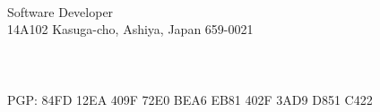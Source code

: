 \documentclass{cv_style_yui}
\begin{document}

\begin{center} 
   \\
  Software Developer \\
  14\-A102 Kasuga-cho, Ashiya, Japan 659-0021 \\
   \\
   \\
   \\
  PGP: 84FD 12EA 409F 72E0 BEA6 EB81 402F 3AD9 D851 C422  
\end{center}


\vphantom{A}

\vphantom{A}

\vphantom{A}
\end{document}
